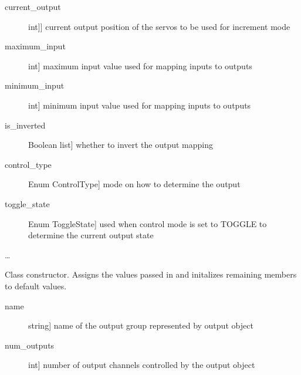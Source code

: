 \documentclass[letterpaper,10pt,english]{sphinxmanual}
\begin{document}
\begin{fulllineitems}
\begin{description}
\item[{current\_output}] \leavevmode{[}{[}int{]}{]}
\sphinxAtStartPar
current output position of the servos to be used for increment mode

\item[{maximum\_input}] \leavevmode{[}int{]}
\sphinxAtStartPar
maximum input value used for mapping inputs to outputs

\item[{minimum\_input}] \leavevmode{[}int{]}
\sphinxAtStartPar
minimum input value used for mapping inputs to outputs

\item[{is\_inverted}] \leavevmode{[}Boolean list{]}
\sphinxAtStartPar
whether to invert the output mapping

\item[{control\_type}] \leavevmode{[}Enum ControlType{]}
\sphinxAtStartPar
mode on how to determine the output

\item[{toggle\_state}] \leavevmode{[}Enum ToggleState{]}
\sphinxAtStartPar
used when control mode is set to TOGGLE to determine the current output state

\end{description}

\sphinxAtStartPar
…

\sphinxAtStartPar
{}

\begin{fulllineitems}
\label{\detokenize{generic:AnalogOutputObject.AnalogOutputObject.__init__}}
\sphinxAtStartPar
Class constructor. Assigns the values passed in and initalizes remaining members to default values.

\sphinxAtStartPar
{}
\begin{description}
\item[{name}] \leavevmode{[}string{]}
\sphinxAtStartPar
name of the output group represented by output object

\item[{num\_outputs}] \leavevmode{[}int{]}
\sphinxAtStartPar
number of output channels controlled by the output object


\end{description}
\end{fulllineitems}
\end{fulllineitems}
\end{document}
